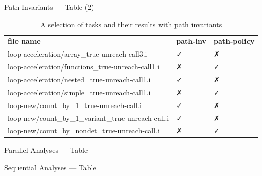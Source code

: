 \documentclass{beamer}
\newcommand{\backupend}{
   \addtocounter{framenumberappendix}{-\value{framenumber}}
   \addtocounter{framenumber}{\value{framenumberappendix}} 
}
\begin{document}
\begin{frame}{Path Invariants --- Table (2)}
\begin{table}
 \caption{A selection of tasks and their results with path invariants}
\begin{adjustbox}{max width=\textwidth}
  \begin{tabular}{lll}
  \toprule
  \textbf{file name} & \textbf{path-inv} & \textbf{path-policy} \\
  \cmidrule(lr){1-1}\cmidrule(lr){2-2}\cmidrule(lr){3-3}
loop-acceleration/array\_true-unreach-call3.i & ✓ & ✗ \\
loop-acceleration/functions\_true-unreach-call1.i & ✗ & ✓ \\
loop-acceleration/nested\_true-unreach-call1.i & ✓ & ✗  \\
loop-acceleration/simple\_true-unreach-call1.i & ✗ & ✓ \\
\rowcolor{darkgreen!50} loop-new/count\_by\_1\_true-unreach-call.i & ✓ & ✗ \\
loop-new/count\_by\_1\_variant\_true-unreach-call.i & ✓ & ✗ \\
loop-new/count\_by\_nondet\_true-unreach-call.i & ✗ & ✓ \\
\bottomrule
 \end{tabular}
 \end{adjustbox}

\end{table}
\end{frame}

\begin{frame}{Parallel Analyses --- Table}
 
\end{frame}

\begin{frame}{Sequential Analyses --- Table}
 
\end{frame}
\backupend
\end{document}
